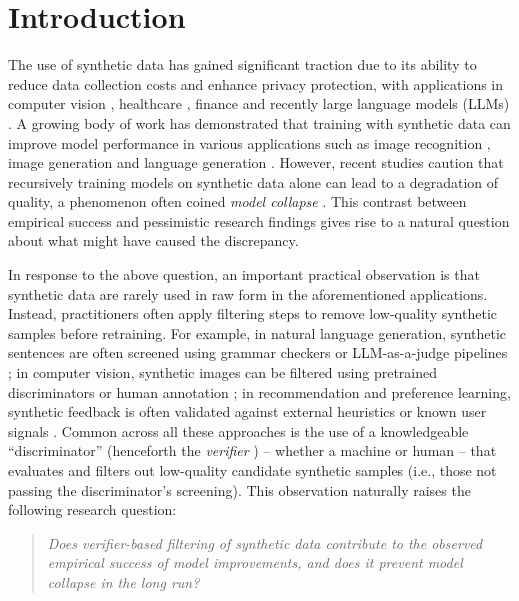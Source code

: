 

\section{Introduction}

The use of synthetic data has gained significant traction due to its ability to reduce data collection costs and enhance privacy protection, with applications in computer vision \citep{wood2021fake}, healthcare \citep{azizi2021can, santangelo2025good}, finance \citep{potluru2023synthetic} and recently large language models (LLMs) \citep{chen2024diversity}. A growing body of work has demonstrated that training with synthetic data can improve model performance in various applications such as image recognition \citep{hesynthetic, tremblay2018training}, image generation \citep{doersch2019sim2real,shrivastava2017learning,tian2023stablerep} and language generation \citep{gunasekar2023textbooks,guo2024deepseek,zelikman2022star}.   However, recent studies caution that recursively training models on synthetic data alone can lead to a degradation of quality, a phenomenon often coined \emph{model collapse} \citep{shumailov2024ai, dohmatob2024model, dohmatobstrong, dohmatob2024tale, alemohammad2023self, gerstgrasser2024model}. This contrast between  empirical success  and pessimistic research findings   gives rise to a natural question about what might have caused the discrepancy. 

In response to the above question, an important practical observation  is that synthetic data  are rarely used in raw form in the aforementioned applications. Instead, practitioners often apply filtering steps to remove low-quality synthetic samples before retraining. For example, in natural language generation, synthetic sentences are often   screened using grammar checkers or LLM-as-a-judge pipelines \citep{zheng2023judging,gu2024survey}; in computer vision, synthetic images can be filtered using pretrained discriminators  or human annotation \citep{hesynthetic}; in recommendation and preference learning, synthetic feedback is often validated against external heuristics or known user signals \citep{tu2025resofilter, iskander2024quality, lupidi2024source2synth, lampis2023bridging, zhang2024regurgitative}.
Common across all these approaches is the use of a knowledgeable ``discriminator'' (henceforth the \emph{verifier} ) -- whether a machine or human --   that evaluates and filters out low-quality candidate synthetic samples (i.e., those not passing the discriminator's screening).
This observation naturally  raises the following research question: 
\begin{quote} 
    \emph{Does  verifier-based filtering of synthetic data contribute to the observed empirical success of   model improvements, and does it prevent model collapse in the long run?} 
\end{quote} 

